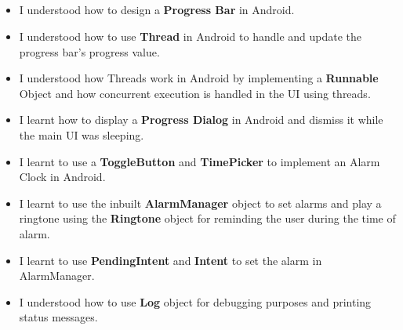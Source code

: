\documentclass[12pt, a4]{article}
\begin{document}
\subsection*{}
\begin{itemize}
\item I understood how to design a \textbf{Progress Bar} in Android.
\item I understood how to use \textbf{Thread} in Android to handle and update the progress bar's progress value.
\item I understood how Threads work in Android by implementing a \textbf{Runnable} Object and how concurrent execution is handled in the UI using threads.
\item I learnt how to display a \textbf{Progress Dialog} in Android and dismiss it while the main UI was sleeping.
\item I learnt to use a \textbf{ToggleButton} and \textbf{TimePicker} to implement an Alarm Clock in Android.
\item I learnt to use the inbuilt \textbf{AlarmManager} object to set alarms and play a ringtone using the \textbf{Ringtone} object for reminding the user during the time of alarm.
\item I learnt to use \textbf{PendingIntent} and \textbf{Intent} to set the alarm in AlarmManager.
\item I understood how to use \textbf{Log} object for debugging purposes and printing status messages.

\end{itemize}
\end{document}
